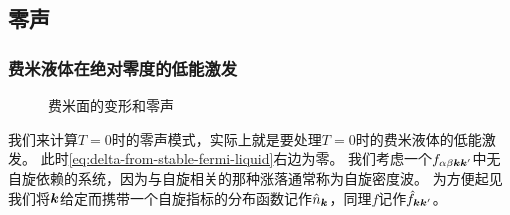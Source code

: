 \subsection{零声}\label{sec:zero-sound-fermi-liquid}

\subsubsection{费米液体在绝对零度的低能激发}

\begin{figure}
    \centering
    \subfigure[变形的费米面，费米液体在$T=0$时的低能激发普遍具有这个形式]{
        
    }
    \caption{费米面的变形和零声}
\end{figure}


我们来计算$T=0$时的零声模式，实际上就是要处理$T=0$时的费米液体的低能激发。
此时\eqref{eq:delta-from-stable-fermi-liquid}右边为零。
我们考虑一个$f_{\alpha \beta \vb*{k} \vb*{k}'}$中无自旋依赖的系统，因为与自旋相关的那种涨落通常称为自旋密度波。
为方便起见我们将$\vb*{k}$给定而携带一个自旋指标的分布函数记作$\hat{n}_{\vb*{k}}$，同理$f$记作$\hat{f}_{\vb*{k} \vb*{k}'}$。

